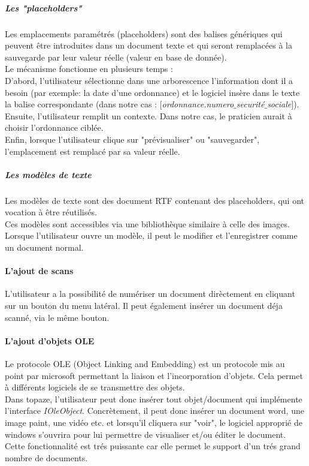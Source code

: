 \subparagraph*{Les "placeholders"}
Les emplacements paramétrés (placeholders) sont des balises génériques qui peuvent être introduites dans un document texte et qui seront remplacées à la sauvegarde par leur valeur réelle (valeur en base de donnée).\\

Le mécanisme fonctionne en plusieurs temps : \\
D'abord, l'utilisateur sélectionne dans une arborescence l'information dont il a besoin (par exemple: la date d'une ordonnance) et le logiciel insère dans le texte la balise correspondante (dans notre cas : \textit{$[$ordonnance.numero$\_$securité$\_$sociale$]$}). \\
Ensuite, l'utilisateur remplit un contexte. Dans notre cas, le praticien aurait à choisir l'ordonnance ciblée.\\
Enfin, lorsque l'utilisateur clique sur "prévisualiser" ou "sauvegarder", l'emplacement est remplacé par sa valeur réelle.

\subparagraph*{Les modèles de texte}
Les modèles de texte sont des document RTF contenant des placeholders, qui ont vocation à être réutilisés.\\
Ces modèles sont accessibles via une bibliothèque similaire à celle des images. 
Lorsque l'utilisateur ouvre un modèle, il peut le modifier et l'enregistrer comme un document normal. 

\paragraph*{L'ajout de scans \\}
L'utilisateur a la possibilité de numériser un document dirèctement en cliquant sur un bouton du menu latéral. Il peut également insérer un document déja scanné, via le même bouton.

\paragraph*{L'ajout d'objets OLE\\}
Le protocole OLE (Object Linking and Embedding) est un protocole mis au point par microsoft permettant la liaison et l'incorporation d'objets. Cela permet à différents logiciels de se transmettre des objets. \\
Dans topaze, l'utilisateur peut donc insérer tout objet/document qui implémente l'interface \textit{IOleObject}. Concrètement, il peut donc insérer un document word, une image paint, une vidéo etc. et lorsqu'il cliquera sur "voir", le logiciel approprié de windows s'ouvrira pour lui permettre de visualiser et/ou éditer le document.
Cette fonctionnalité est trés puissante car elle permet le support d'un trés grand nombre de documents. 

